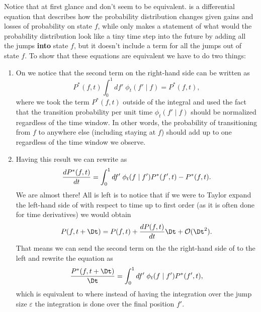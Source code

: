 Notice that at first glance  and
 don't seem to be equivalent.
 is a differential equation that describes how the
probability distribution changes given gains and losses of probability on state
$f$, while  only makes a statement of what would the
probability distribution look like a tiny time step into the future by adding
all the jumps \textbf{into} state $f$, but it doesn't include a term for all the
jumps out of state $f$. To show that these equations are equivalent we have to
do two things:
\begin{enumerate}
  \item On  we notice that the second term on the
  right-hand side can be written as
  \begin{equation}
    P^*(f, t)\int_0^1 df' \; \phi_t(f' \mid f) = P^*(f, t),
    \label{eq_integral_transition}
  \end{equation}
  where we took the term $P^*(f, t)$ outside of the integral and used the fact
  that the transition probability per unit time $\phi_t(f' \mid f)$ should be
  normalized regardless of the time window. In other words, the probability of
  transitioning from $f$ to anywhere else (including staying at $f$) should add
  up to one regardless of the time window we observe.
  \item Having this result we can rewrite  as
  \begin{equation}
    {d{P^*(f, t)} \over dt} = \int_0^1 df' \;
    \phi_t(f \mid f') P^*(f', t) - P^*(f, t).
    \label{eq_master_eq_rearange}
  \end{equation}
  We are almost there! All is left is to notice that if we were to Taylor expand
  the left-hand side of  with respect to time up to
  first order (as it is often done for time derivatives) we would obtain
  \begin{equation}
    P(f, t + \Dt) = P(f, t) + \dt{P(f, t)}\Dt + \mathcal{O}(\Dt^2).
  \end{equation}
  That means we can send the second term on the the right-hand side of
   to the left and rewrite the equation as
  \begin{equation}
    {P^*(f, t + \Dt) \over \Dt} = \int_0^1 df' \;
    \phi_t(f \mid f') P^*(f', t),
  \end{equation}
  which is equivalent to  where instead of having
  the integration over the jump size $\varepsilon$ the integration is done over
  the final position $f'$.
\end{enumerate}
